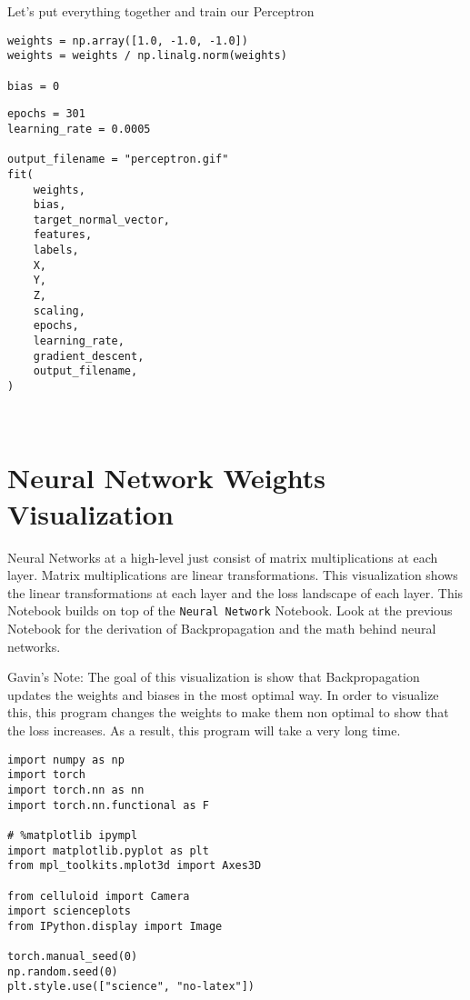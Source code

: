 \documentclass[openany]{book}
\begin{document}
    Let's put everything together and train our Perceptron

\begin{tcolorbox}
\tiny
\begin{verbatim}
weights = np.array([1.0, -1.0, -1.0])
weights = weights / np.linalg.norm(weights)

bias = 0
\end{verbatim}
\end{tcolorbox}

\begin{tcolorbox}
\tiny
\begin{verbatim}
epochs = 301
learning_rate = 0.0005

output_filename = "perceptron.gif"
fit(
    weights,
    bias,
    target_normal_vector,
    features,
    labels,
    X,
    Y,
    Z,
    scaling,
    epochs,
    learning_rate,
    gradient_descent,
    output_filename,
)
\end{verbatim}
\end{tcolorbox}

    \begin{center}
    \end{center}
    { \hspace*{\fill} \\}
        
    \section{Neural Network Weights
Visualization}\label{neural-network-weights-visualization}

Neural Networks at a high-level just consist of matrix multiplications
at each layer. Matrix multiplications are linear transformations. This
visualization shows the linear transformations at each layer and the
loss landscape of each layer. This Notebook builds on top of the
\texttt{Neural\ Network} Notebook. Look at the previous Notebook for the
derivation of Backpropagation and the math behind neural networks.

    Gavin's Note: The goal of this visualization is show that
Backpropagation updates the weights and biases in the most optimal way.
In order to visualize this, this program changes the weights to make
them non optimal to show that the loss increases. As a result, this
program will take a very long time.

\begin{tcolorbox}
\tiny
\begin{verbatim}
import numpy as np
import torch
import torch.nn as nn
import torch.nn.functional as F

# %matplotlib ipympl
import matplotlib.pyplot as plt
from mpl_toolkits.mplot3d import Axes3D

from celluloid import Camera
import scienceplots
from IPython.display import Image

torch.manual_seed(0)
np.random.seed(0)
plt.style.use(["science", "no-latex"])
\end{verbatim}
\end{tcolorbox}
\end{document}
